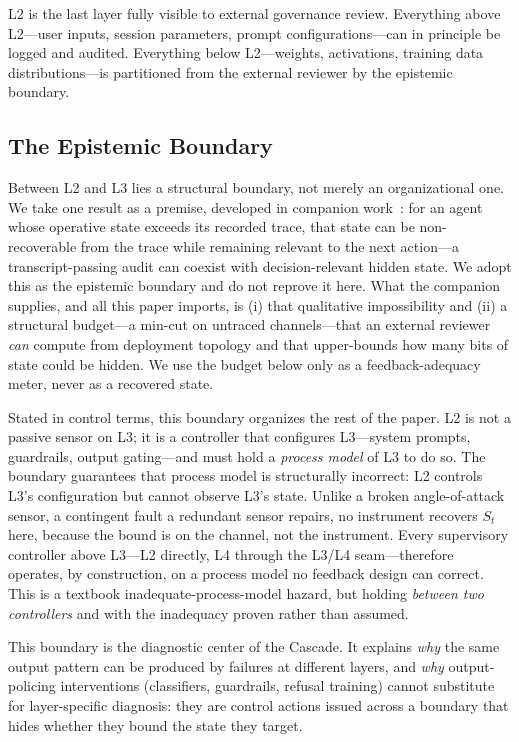L2 is the last layer fully visible to external governance review. Everything above L2---user inputs, session parameters, prompt configurations---can in principle be logged and audited. Everything below L2---weights, activations, training data distributions---is partitioned from the external reviewer by the epistemic boundary.

\subsection{The Epistemic Boundary}

Between L2 and L3 lies a structural boundary, not merely an organizational one. We take one result as a premise, developed in companion work~\cite{anon2026dual}: for an agent whose operative state exceeds its recorded trace, that state can be non-recoverable from the trace while remaining relevant to the next action---a transcript-passing audit can coexist with decision-relevant hidden state. We adopt this as the epistemic boundary and do not reprove it here. What the companion supplies, and all this paper imports, is (i) that qualitative impossibility and (ii) a structural budget---a min-cut on untraced channels---that an external reviewer \emph{can} compute from deployment topology and that upper-bounds how many bits of state could be hidden. We use the budget below only as a feedback-adequacy meter, never as a recovered state.

Stated in control terms, this boundary organizes the rest of the paper. L2 is not a passive sensor on L3; it is a controller that configures L3---system prompts, guardrails, output gating---and must hold a \emph{process model} of L3 to do so. The boundary guarantees that process model is structurally incorrect: L2 controls L3's configuration but cannot observe L3's state. Unlike a broken angle-of-attack sensor, a contingent fault a redundant sensor repairs, no instrument recovers $S_t$ here, because the bound is on the channel, not the instrument. Every supervisory controller above L3---L2 directly, L4 through the L3/L4 seam---therefore operates, by construction, on a process model no feedback design can correct. This is a textbook inadequate-process-model hazard, but holding \emph{between two controllers} and with the inadequacy proven rather than assumed.

This boundary is the diagnostic center of the Cascade. It explains \textit{why} the same output pattern can be produced by failures at different layers, and \textit{why} output-policing interventions (classifiers, guardrails, refusal training) cannot substitute for layer-specific diagnosis: they are control actions issued across a boundary that hides whether they bound the state they target.

